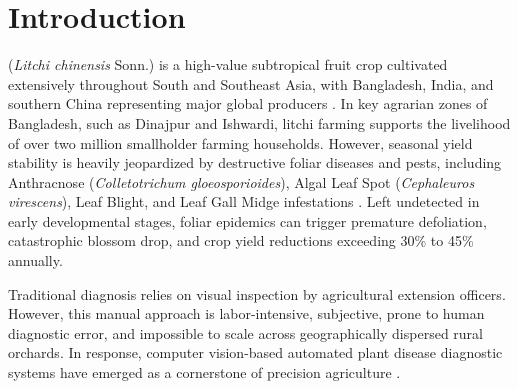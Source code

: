 \documentclass[journal]{IEEEtran}
\begin{document}
\section{Introduction}
 (\textit{Litchi chinensis} Sonn.) is a high-value subtropical fruit crop cultivated extensively throughout South and Southeast Asia, with Bangladesh, India, and southern China representing major global producers \cite{litchi_dataset_2022}. In key agrarian zones of Bangladesh, such as Dinajpur and Ishwardi, litchi farming supports the livelihood of over two million smallholder farming households. However, seasonal yield stability is heavily jeopardized by destructive foliar diseases and pests, including Anthracnose (\textit{Colletotrichum gloeosporioides}), Algal Leaf Spot (\textit{Cephaleuros virescens}), Leaf Blight, and Leaf Gall Midge infestations \cite{islam2021survey}. Left undetected in early developmental stages, foliar epidemics can trigger premature defoliation, catastrophic blossom drop, and crop yield reductions exceeding 30\% to 45\% annually.

Traditional diagnosis relies on visual inspection by agricultural extension officers. However, this manual approach is labor-intensive, subjective, prone to human diagnostic error, and impossible to scale across geographically dispersed rural orchards. In response, computer vision-based automated plant disease diagnostic systems have emerged as a cornerstone of precision agriculture \cite{mohanty2016using, ferentinos2018deep, barbedo2019plant}.
\end{document}
